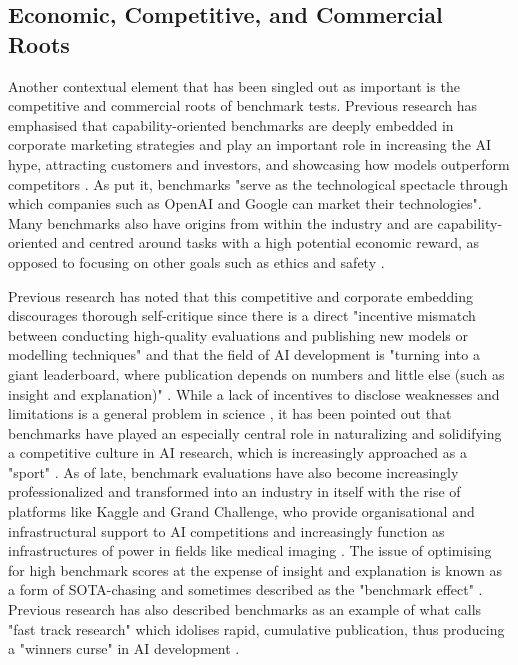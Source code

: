 \subsection{Economic, Competitive, and Commercial Roots}

Another contextual element that has been singled out as important is the competitive and commercial roots of benchmark tests. %
Previous research has emphasised that capability-oriented benchmarks are deeply embedded in corporate marketing strategies and play an important role in increasing the AI hype, attracting customers and investors, and showcasing how models outperform competitors \cite{orr2024a, grill2024, Zhijia2024}. As \citet[p.~1881]{orr2024a} put it, benchmarks "serve as the technological spectacle through which companies such as OpenAI and Google can market their technologies". Many benchmarks also have origins from within the industry and are capability-oriented and centred around tasks with a high potential economic reward, as opposed to focusing on other goals such as ethics and safety \cite{ren2024, ethayarajh2021}.


Previous research has noted that this competitive and corporate embedding discourages thorough self-critique since there is a direct "incentive mismatch between conducting high-quality evaluations and publishing new models or modelling techniques" \cite[p.~103]{gehrmann2023} and that the field of AI development is "turning into a giant leaderboard, where publication depends on numbers and little else (such as insight and explanation)" \cite{church_survey_2019}. 
While a lack of incentives to disclose weaknesses and limitations is a general problem in science \cite{smith2022}, it has been pointed out that benchmarks have played an especially central role in naturalizing and solidifying a competitive culture in AI research, which is increasingly approached as a "sport" \cite{orr2024a}. As of late, benchmark evaluations have also become increasingly professionalized and transformed into an industry in itself with the rise of platforms like Kaggle and Grand Challenge, who provide organisational and infrastructural support to AI competitions and increasingly function as infrastructures of power in fields like medical imaging \cite{luitse2024}. The issue of optimising for high benchmark scores at the expense of insight and explanation is known as a form of SOTA-chasing \cite{koch2021} and sometimes described as the "benchmark effect" \cite{Stewart2023}. Previous research \cite{maleve2023} has also described benchmarks as an example of what \citet{stengers2018} calls "fast track research" which idolises rapid, cumulative publication, thus producing a "winners curse" in AI development \cite{sculley2018}. 

